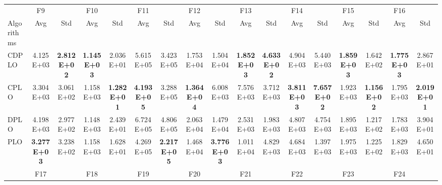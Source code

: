 \documentclass[review]{elsarticle}
\begin{document}
\begin{table}
\begin{tabular}{@{}lcccccccccccccccc@{}}
           & F9                 &                    & F10                &                    & F11                &                    & F12                &                    & F13                &                    & F14                  &                     & F15                &                    & F16                &                    \\
Algorithms & Avg                & Std                & Avg                & Std                & Avg                & Std                & Avg                & Std                & Avg                & Std                & Avg                  & Std                 & Avg                & Std                & Avg                & Std                \\
CDPLO      & 4.125E+03          & \textbf{2.812E+02} & \textbf{1.145E+03} & 2.036E+01          & 5.615E+05          & 3.423E+05          & 1.753E+04          & 1.504E+04          & \textbf{1.852E+03} & \textbf{4.633E+02} & 4.904E+03            & 5.440E+03           & \textbf{1.859E+03} & 1.642E+02          & \textbf{1.775E+03} & 2.867E+01          \\
CPLO       & 3.304E+03          & 3.061E+02          & 1.158E+03          & \textbf{1.282E+01} & \textbf{4.193E+05} & 3.288E+05          & \textbf{1.364E+04} & 6.008E+03          & 7.576E+03          & 3.712E+03          & \textbf{3.811E+03}   & \textbf{7.657E+02}  & 1.923E+03          & \textbf{1.156E+02} & 1.795E+03          & \textbf{2.019E+01} \\
DPLO       & 4.198E+03          & 2.977E+02          & 1.148E+03          & 2.439E+01          & 6.724E+05          & 4.806E+05          & 2.063E+04          & 1.479E+04          & 2.531E+03          & 1.983E+03          & 4.807E+03            & 4.754E+03           & 1.895E+03          & 1.217E+02          & 1.783E+03          & 3.904E+01          \\
PLO        & \textbf{3.277E+03} & 3.238E+02          & 1.158E+03          & 1.628E+01          & 4.269E+05          & \textbf{2.217E+05} & 1.468E+04          & \textbf{3.776E+03} & 1.011E+04          & 4.829E+03          & 4.684E+03            & 1.397E+03           & 1.975E+03          & 1.225E+02          & 1.829E+03          & 4.650E+01          \\
           & F17                &                    & F18                &                    & F19                &                    & F20                &                    & F21                &                    & F22                  &                     & F23                &                    & F24                &                    \\

\end{tabular}
\end{table}
\end{document}
